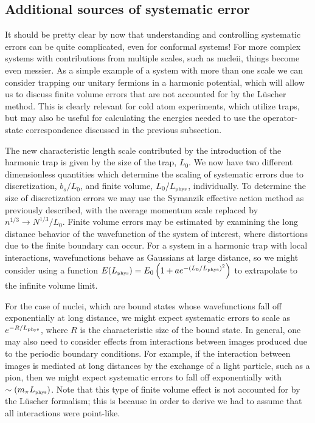 \subsection{Additional sources of systematic error}
It should be pretty clear by now that understanding and controlling systematic errors can be quite complicated, even for conformal systems! For more complex systems with contributions from multiple scales, such as nucleii, things become even messier. As a simple example of a system with more than one scale we can consider trapping our unitary fermions in a harmonic potential, which will allow us to discuss finite volume errors that are not accounted for by the L\"uscher method. This is clearly relevant for cold atom experiments, which utilize traps, but may also be useful for calculating the energies needed to use the operator-state correspondence discussed in the previous subsection.

The new characteristic length scale contributed by the introduction of the harmonic trap is given by the size of the trap, $L_0$. We now have two different dimensionless quantities which determine the scaling of systematic errors due to discretization, $b_s/L_0$, and finite volume, $L_0/L_{\mbox{\tiny phys}}$, individually. To determine the size of discretization errors we may use the Symanzik effective action method as previously described, with the average momentum scale replaced by $n^{1/3} \to N^{1/3}/L_0$. Finite volume errors may be estimated by examining the long distance behavior of the wavefunction of the system of interest, where distortions due to the finite boundary can occur. For a system in a harmonic trap with local interactions, wavefunctions behave as Gaussians at large distance, so we might consider using a function $E(L_{\mbox{\tiny phys}}) = E_0\left(1+a e^{-\left(L_0/L_{\mbox{\tiny phys}}\right)^2}\right)$ to extrapolate to the infinite volume limit. 

For the case of nuclei, which are bound states whose wavefunctions fall off exponentially at long distance, we might expect systematic errors to scale as $e^{-R/L_{\mbox{\tiny phys}}}$, where $R$ is the characteristic size of the bound state. In general, one may also need to consider effects from interactions between images produced due to the periodic boundary conditions. For example, if the interaction between images is mediated at long distances by the exchange of a light particle, such as a pion, then we might expect systematic errors to fall off exponentially with $\sim \left(m_{\pi} L_{\mbox{\tiny phys}}\right)$. Note that this type of finite volume effect is not accounted for by the L\"uscher formalism; this is because in order to derive  we had to assume that all interactions were point-like.

